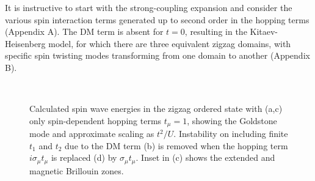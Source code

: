 \documentclass[aps,prb,fleqn,12pt,amsmath,amssymb]{revtex4}
\begin{document}
It is instructive to start with the strong-coupling expansion and consider the various spin interaction terms generated up to second order in the hopping terms (Appendix A). The DM term is absent for $t=0$, resulting in the Kitaev-Heisenberg model, for which there are three equivalent zigzag domains, with specific spin twisting modes transforming from one domain to another (Appendix B). 


\begin{figure}[htbp]
\hspace*{-0mm}
\begin{minipage}[b]{0.45\linewidth}
\centering
{}
\end{minipage}
\hspace{0.8cm}
\begin{minipage}[b]{0.45\linewidth}
\centering
{}
\end{minipage} \\
%
\hspace*{-0mm}
\begin{minipage}[b]{0.45\linewidth}
\centering
{} \vspace*{-52mm}
\end{minipage}
\hspace{0.8cm}
\begin{minipage}[b]{0.45\linewidth}
\centering
{} 
\end{minipage} \vspace*{5mm}
\caption{Calculated spin wave energies in the zigzag ordered state with (a,c) only spin-dependent hopping terms $t_\mu = 1$, showing the Goldstone mode and approximate scaling as $t^2/U$. Instability on including finite $t_1$ and $t_2$ due to the DM term (b) is removed when the hopping term $i\sigma_\mu t_\mu$ is replaced (d) by $\sigma_\mu t_\mu$. Inset in (c) shows the extended and magnetic Brillouin zones.}
\label{fig3}
\end{figure}
\end{document}
